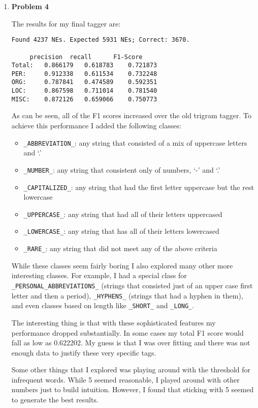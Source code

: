 \documentclass[10pt]{article}
\begin{document}
\begin{enumerate}
\newpage

\item {\bf Problem 4}

The results for my final tagger are:

\begin{verbatim}
Found 4237 NEs. Expected 5931 NEs; Correct: 3670.

	 precision 	recall 		F1-Score
Total:	 0.866179	0.618783	0.721873
PER:	 0.912338	0.611534	0.732248
ORG:	 0.787841	0.474589	0.592351
LOC:	 0.867598	0.711014	0.781540
MISC:	 0.872126	0.659066	0.750773
\end{verbatim}


As can be seen, all of the F1 scores increased over the old trigram tagger. To achieve this performance I added the following classes:

\begin{itemize}

\item {\tt \_ABBREVIATION\_}: any string that consisted of a mix of uppercase letters and `.'

\item {\tt \_NUMBER\_}: any string that consistent only of numbers, `-' and `.'

\item {\tt \_CAPITALIZED\_}: any string that had the first letter uppercase but the rest lowercase

\item {\tt \_UPPERCASE\_}: any string that had all of their letters uppercased

\item {\tt \_LOWERCASE\_}: any string that has all of their letters lowercased

\item {\tt \_RARE\_}: any string that did not meet any of the above criteria

\end{itemize}

While these classes seem fairly boring I also explored many other more interesting classes. For example, I had a special class for {\tt \_PERSONAL\_ABBREVIATIONS\_} (strings that consisted just of an upper case first letter and then a period), {\tt \_HYPHENS\_} (strings that had a hyphen in them), and even classes based on length like {\tt \_SHORT\_} and {\tt \_LONG\_}. 

The interesting thing is that with these sophisticated features my performance dropped substantially. In some cases my total F1 score would fall as low as 0.622202. My guess is that I was over fitting and there was not enough data to justify these very specific tags.

Some other things that I explored was playing around with the threshold for infrequent words. While 5 seemed reasonable, I played around with other numbers just to build intuition. However, I found that sticking with 5 seemed to generate the best results.

\end{enumerate}
\end{document}
